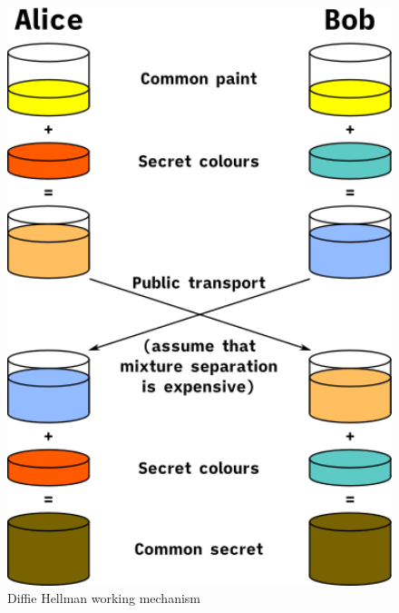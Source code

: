 \begin{figure}[H]
	\centering
	\includegraphics[width=160mm]{images/Diffie-Hellman_Key_Exchange.png}
	\caption{Diffie Hellman working mechanism}
	\label{figDeffie Hellman Algorithm} %
\end{figure}
\pagebreak


\pagebreak
